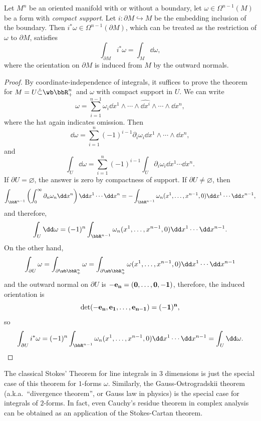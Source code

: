 \begin{thm}\label{thm stokes-cartan}
    Let $M^n$ be an oriented manifold with or without a boundary, let $\omega\in \Omega^{n-1}(M)$ be a form with \emph{compact support}. Let $i:\partial M\hookrightarrow M$ be the embedding inclusion of the boundary. Then $i^\ast\omega\in\Omega^{n-1}(\partial M)$, which can be treated as the restriction of $\omega$  to $\partial M$, satisfies
    \[\int_{\partial M}i^\ast \omega=\int_M \dd \omega,\]
    where the orientation on $\partial M$ is induced from $M$ by the outward normals.
\end{thm}
\begin{proof}
    By coordinate-independence of integrals, it suffices to prove the theorem for $M=U\mathring\subset \wb\bbR^n_+$ and $\omega$ with compact support in $U$. We can write
    \[\omega=\sum_{i=1}^{n-1}\omega_i \dd x^1\wedge\cdots \wedge \widehat{\dd x^i}\wedge \cdots\wedge \dd x^n,\]
    where the hat again indicates omission. Then
    \[\dd \omega=\sum_{i=1}^n (-1)^{i-1}\partial_i\omega_i \dd x^1\wedge\cdots\wedge\dd x^n,\]
    and 
    \[\int_U \dd\omega=\sum_{i=1}^n(-1)^{i-1}\int_U \partial_i\omega_i\dd x^1\cdots\dd x^n.\]
    If $\partial U=\varnothing$, the answer is zero by compactness of support. If $\partial U\neq\varnothing$, then
    \[\int_{\bbR^{n-1}}\left(\int_0^\infty \partial_n\omega_n\dd x^n\right)\dd x^1\cdots\dd x^n=-\int_{\bbR^{n-1}}\omega_n(x^1,\ldots,x^{n-1},0)\dd x^1\cdots\dd x^{n-1},\]
    and therefore, 
    \[\int_U \dd\omega=(-1)^n\int_{\bbR^{n-1}}\omega_n(x^1,\ldots,x^{n-1},0)\dd x^1\cdots\dd x^{n-1}.\]
    On the other hand, 
    \[\int_{\partial U}\omega=\int_{\partial \wb\bbR^n_+}\omega=\int_{\partial \wb\bbR^n_+}\omega(x^1,\ldots,x^{n-1},0)\dd x^1\cdots \dd x^{n-1}\] 
    and the outward normal on $\partial U$ is $-\bf{e}_n=(0,\ldots,0,-1)$, therefore, the induced orientation is 
    \[\det(-\bf{e}_n,\bf{e}_1,\ldots,\bf{e}_{n-1})=(-1)^n,\] 
    so
    \[\int_{\partial U}i^\ast\omega=(-1)^{n}\int_{\bbR^{n-1}}\omega_n(x^1,\ldots,x^{n-1},0)\dd x^1\cdots\dd x^{n-1}=\int_U \dd\omega.\]
\end{proof}
\begin{rem}
    The classical Stokes' Theorem for line integrals in $3$ dimensions is just the special case of this theorem for $1$-forms $\omega$. Similarly, the Gauss-Ostrogradskii theorem (a.k.a.\ ``divergence theorem'', or Gauss law in physics) is the special case for integrals of $2$-forms. In fact, even Cauchy's residue theorem in complex analysis can be obtained as an application of the Stokes-Cartan theorem.
\end{rem}

